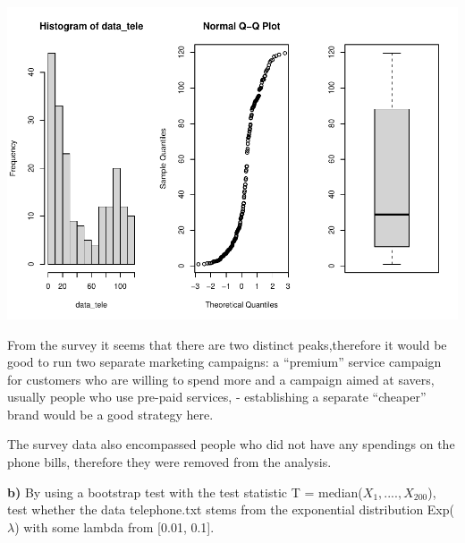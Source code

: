 \documentclass[
]{article}
\begin{document}
\includegraphics{Assignment-1_files/figure-latex/unnamed-chunk-7-1.pdf}

From the survey it seems that there are two distinct peaks,therefore it
would be good to run two separate marketing campaigns: a ``premium''
service campaign for customers who are willing to spend more and a
campaign aimed at savers, usually people who use pre-paid services, -
establishing a separate ``cheaper'' brand would be a good strategy here.

The survey data also encompassed people who did not have any spendings
on the phone bills, therefore they were removed from the analysis.

\textbf{b)} By using a bootstrap test with the test statistic T =
median(\(X_1,....,X_200\)), test whether the data telephone.txt stems
from the exponential distribution Exp(\(\lambda\)) with some lambda from
{[}0.01, 0.1{]}.
\end{document}
